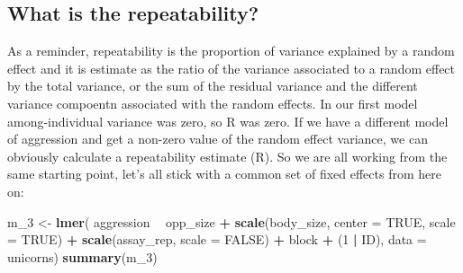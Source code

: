 \documentclass[
  12pt,
]{book}
\newenvironment{Shaded}{\begin{snugshade}}{\end{snugshade}}
\newcommand{\DataTypeTok}[1]{\textcolor[rgb]{0.13,0.29,0.53}{#1}}
\newcommand{\DecValTok}[1]{\textcolor[rgb]{0.00,0.00,0.81}{#1}}
\newcommand{\KeywordTok}[1]{\textcolor[rgb]{0.13,0.29,0.53}{\textbf{#1}}}
\newcommand{\NormalTok}[1]{#1}
\newcommand{\OperatorTok}[1]{\textcolor[rgb]{0.81,0.36,0.00}{\textbf{#1}}}
\newcommand{\OtherTok}[1]{\textcolor[rgb]{0.56,0.35,0.01}{#1}}
\newcommand{\StringTok}[1]{\textcolor[rgb]{0.31,0.60,0.02}{#1}}
\begin{document}
\hypertarget{what-is-the-repeatability}{%
\subsection{What is the repeatability?}\label{what-is-the-repeatability}}

As a reminder, repeatability is the proportion of variance explained by a random effect and it is estimate as the ratio of the variance associated to a random effect by the total variance, or the sum of the residual variance and the different variance compoentn associated with the random effects.
In our first model among-individual variance was zero, so R was zero. If we have a different model of aggression and get a non-zero value of the random effect variance, we can obviously calculate a repeatability estimate (R). So we are all working from the same starting point, let's all stick with a common set of fixed effects from here on:

\begin{Shaded}
\begin{Highlighting}[]
\NormalTok{m_}\DecValTok{3}\NormalTok{ <-}\StringTok{ }\KeywordTok{lmer}\NormalTok{(}
\NormalTok{  aggression }\OperatorTok{~}\StringTok{ }\NormalTok{opp_size }\OperatorTok{+}\StringTok{ }\KeywordTok{scale}\NormalTok{(body_size, }\DataTypeTok{center =} \OtherTok{TRUE}\NormalTok{, }\DataTypeTok{scale =} \OtherTok{TRUE}\NormalTok{)}
              \OperatorTok{+}\StringTok{ }\KeywordTok{scale}\NormalTok{(assay_rep, }\DataTypeTok{scale =} \OtherTok{FALSE}\NormalTok{) }\OperatorTok{+}\StringTok{ }\NormalTok{block}
              \OperatorTok{+}\StringTok{ }\NormalTok{(}\DecValTok{1} \OperatorTok{|}\StringTok{ }\NormalTok{ID),}
  \DataTypeTok{data =}\NormalTok{ unicorns)}
\KeywordTok{summary}\NormalTok{(m_}\DecValTok{3}\NormalTok{)}
\end{Highlighting}
\end{Shaded}
\end{document}
